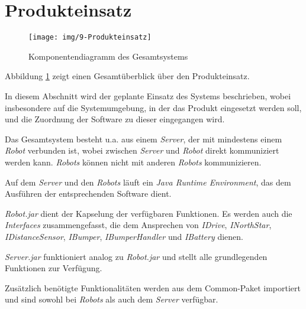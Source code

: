 \section{Produkteinsatz}

\begin{figure}[H]
\centering
\texttt{[image: img/9-Produkteinsatz]}
\caption{Komponentendiagramm des Gesamtsystems}
\label{ProdukteinsatzKomp}
\end{figure}

Abbildung \ref{ProdukteinsatzKomp} zeigt einen Gesamtüberblick über den Produkteinsatz.

In diesem Abschnitt wird der geplante Einsatz des Systems beschrieben, wobei insbesondere auf die Systemumgebung, in der das Produkt eingesetzt werden soll, und die Zuordnung der Software zu dieser eingegangen wird.

Das Gesamtsystem besteht u.a. aus einem \emph{Server}, der mit mindestens einem \emph{Robot} verbunden ist, wobei zwischen \emph{Server} und \emph{Robot} direkt kommuniziert werden kann. \emph{Robots} können nicht mit anderen \emph{Robots} kommunizieren.

Auf dem \emph{Server} und den \emph{Robots} läuft ein \emph{Java Runtime Environment}, das dem Ausführen der entsprechenden Software dient.

\emph{Robot.jar} dient der Kapselung der verfügbaren Funktionen. Es werden auch die \emph{Interfaces} zusammengefasst, die dem Ansprechen von \emph{IDrive}, \emph{INorthStar}, \emph{IDistanceSensor}, \emph{IBumper}, \emph{IBumperHandler} und \emph{IBattery} dienen.

\emph{Server.jar} funktioniert analog zu \emph{Robot.jar} und stellt alle grundlegenden Funktionen zur Verfügung.

Zusätzlich benötigte Funktionalitäten werden aus dem Common-Paket importiert und sind sowohl bei \emph{Robots} als auch dem \emph{Server} verfügbar.
